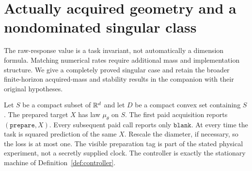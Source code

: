 \section{Actually acquired geometry and a nondominated singular class}\label{sec:geometry}
The raw-response value is a task invariant, not automatically a dimension formula. Matching numerical rates require additional mass and implementation structure. We give a completely proved singular case and retain the broader finite-horizon acquired-mass and stability results in the companion \cite{FiniteHorizon} with their original hypotheses.

Let $S$ be a compact subset of $\mathbb R^d$ and let $D$ be a compact convex set containing $S$. The prepared target $X$ has law $\mu_\theta$ on $S$. The first paid acquisition reports $(\mathtt{prepare},X)$. Every subsequent paid call reports only $\mathtt{blank}$. At every time the task is squared prediction of the same $X$. Rescale the diameter, if necessary, so the loss is at most one. The visible preparation tag is part of the stated physical experiment, not a secretly supplied clock. The controller is exactly the stationary machine of Definition~\ref{def:controller}.

